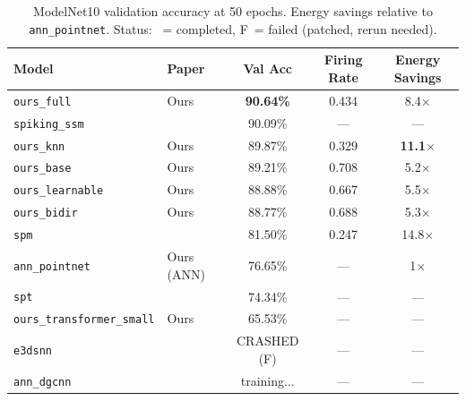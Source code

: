 \documentclass[11pt,a4paper]{article}
\begin{document}
\begin{table}[H]
  \centering
  \caption{ModelNet10 validation accuracy at 50 epochs. Energy savings relative
           to \texttt{ann\_pointnet}. Status: \checkmark~= completed,
           F~= failed (patched, rerun needed).}
  \label{tab:mn10}
  \begin{tabular}{llccc}
    \toprule
    \textbf{Model} & \textbf{Paper} & \textbf{Val Acc} & \textbf{Firing Rate} & \textbf{Energy Savings} \\
    \midrule
    \texttt{ours\_full}      & Ours            & \textbf{90.64\%} & 0.434 & 8.4$\times$ \\
    \texttt{spiking\_ssm}    & \cite{spiking_ssm} & 90.09\%  & ---   & --- \\
    \texttt{ours\_knn}       & Ours            & 89.87\%          & 0.329 & \textbf{11.1$\times$} \\
    \texttt{ours\_base}      & Ours            & 89.21\%          & 0.708 & 5.2$\times$ \\
    \texttt{ours\_learnable} & Ours            & 88.88\%          & 0.667 & 5.5$\times$ \\
    \texttt{ours\_bidir}     & Ours            & 88.77\%          & 0.688 & 5.3$\times$ \\
    \texttt{spm}             & \cite{spm2025}  & 81.50\%          & 0.247 & 14.8$\times$ \\
    \texttt{ann\_pointnet}   & Ours (ANN)      & 76.65\%          & ---   & 1$\times$ \\
    \texttt{spt}             & \cite{spt}      & 74.34\%          & ---   & --- \\
    \texttt{ours\_transformer\_small} & Ours  & 65.53\%          & ---   & --- \\
    \texttt{e3dsnn}          & \cite{e3dsnn}   & CRASHED (F)      & ---   & --- \\
    \midrule
    \texttt{ann\_dgcnn}      & \cite{dgcnn}    & training...      & ---   & --- \\
    \bottomrule
  \end{tabular}
\end{table}
\end{document}
